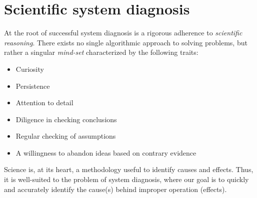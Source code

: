 

















\filbreak
\section{Scientific system diagnosis}

At the root of successful system diagnosis is a rigorous adherence to \textit{scientific reasoning}.  There exists no single algorithmic approach to solving problems, but rather a singular \textit{mind-set} characterized by the following traits:

\begin{itemize}
\item Curiosity 
\item Persistence
\item Attention to detail
\item Diligence in checking conclusions
\item Regular checking of assumptions
\item A willingness to abandon ideas based on contrary evidence
\end{itemize}

Science is, at its heart, a methodology useful to identify causes and effects.  Thus, it is well-suited to the problem of system diagnosis, where our goal is to quickly and accurately identify the cause(s) behind improper operation (effects).


